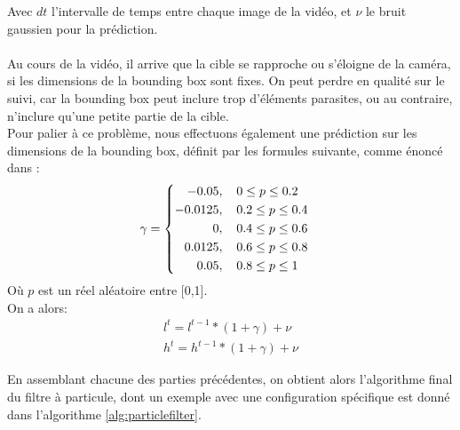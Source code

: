 Avec $dt$ l'intervalle de temps entre chaque image de la vidéo, et $\nu$ le bruit gaussien pour la prédiction.\\
\\
Au cours de la vidéo, il arrive que la cible se rapproche ou s'éloigne de la caméra, si les dimensions de la bounding box sont fixes. On peut perdre en qualité sur le suivi, car la bounding box peut inclure trop d'éléments parasites, ou au contraire, n'inclure qu'une petite partie de la cible.\\
Pour palier à ce problème, nous effectuons également une prédiction sur les dimensions de la bounding box, définit par les formules suivante, comme énoncé dans \cite{kong_particle_2019}:
\begin{equation} \label{eq:gamma}
\gamma=
\begin{cases}
\begin{aligned}
	-0.05,& \hspace{0.4cm}		0 \leq p \leq 0.2\\
    -0.0125,& \hspace{0.4cm}	0.2 \le p \leq 0.4\\
    0,& \hspace{0.4cm}			0.4 \le p \leq 0.6\\
    0.0125,& \hspace{0.4cm}		0.6 \le p \leq 0.8\\
    0.05,& \hspace{0.4cm}		0.8 \le p \leq 1
\end{aligned}
\end{cases}
\end{equation}
Où $p$ est un réel aléatoire entre [0,1].\\
On a alors:
\begin{equation} \label{eq:Bbox}
\begin{split}
l^{t} = l^{t-1} * (1+\gamma) + \nu\\
h^{t} = h^{t-1} * (1+\gamma) + \nu
\end{split}
\end{equation}

En assemblant chacune des parties précédentes, on obtient alors l'algorithme final du filtre à particule, dont un exemple avec une configuration spécifique est donné dans l'algorithme \ref{alg:particlefilter}.


